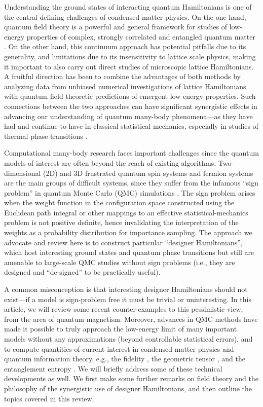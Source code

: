 \documentclass[range]{ar2e}
\begin{document}
Understanding the ground states of interacting quantum Hamiltonians is one of the central defining challenges of condensed matter physics. On the one
hand, quantum field theory is a powerful and general framework for studies of low-energy properties of complex, strongly correlated and entangled 
quantum matter \cite{Sachdev11}. On the other hand, this continuum approach has potential pitfalls due to its generality, and limitations due to its 
insensitivity to lattice scale physics, making it important to also carry out direct studies of microscopic lattice Hamiltonians. A fruitful direction 
has been to combine the advantages of both methods by analyzing data from unbiased numerical investigations of lattice Hamiltonians with quantum field 
theoretic predictions of emergent low energy properties. Such connections between the two approaches can have significant synergistic effects in advancing 
our understanding of quantum many-body phenomena---as they have had and continue to have in classical statistical mechanics, especially in studies 
of thermal phase transitions \cite{cardy1988:fss,Chaikin00}. 

Computational many-body research faces important challenges since the quantum models of interest are often beyond the reach 
of existing algorithms. Two-dimensional (2D) and 3D frustrated quantum spin systems and fermion systems are the main groups 
of difficult systems, since they suffer from the infamous ``sign problem'' in quantum Monte Carlo (QMC) simulations
\cite{Loh90,Henelius00,Nyfeler08}. The sign problem arises when the weight function in the configuration space constructed using the Euclidean path 
integral or other mappings to an effective statistical-mechanics problem is not positive definite, hence invalidating the interpretation of the weights as a probability distribution for importance sampling. The approach we advocate and review here is to construct particular 
``designer Hamiltonians'', which host interesting ground states and quantum phase transitions but still are amenable to 
large-scale QMC studies without sign problems (i.e., they are designed and ``de-signed'' to be practically useful). 


A common misconception is that interesting designer Hamiltonians should not exist---if a model is sign-problem 
free it must be trivial or uninteresting. 
In this article, we will review some recent counter-examples to this pessimistic view, 
from the area of quantum magnetism. 
Moreover, advances in QMC 
methods \cite{Sandvik91,Evertz93,Beard96,WormA,Sandvik99,Sandvik10a} have made it possible to truly approach the 
low-energy limit of many important models without any approximations (beyond controllable statistical errors), and to compute 
quantities of current interest in condensed matter physics and quantum information theory, e.g., the fidelity 
\cite{Schwandt09}, the geometric tensor \cite{Degrandi11}, and the entanglement entropy \cite{Hastings10, Melko10}. We will 
briefly address some of these technical developments as well. We first make some further remarks on field theory and the philosophy 
of the synergistic use of designer Hamiltonians, and then outline the topics covered in this review.
\end{document}
